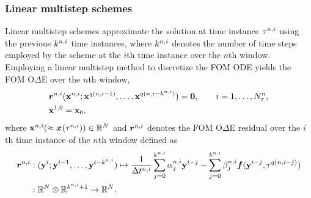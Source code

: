 \subsubsection{Linear multistep schemes}
Linear multistep schemes approximate the solution at time instance $\tau^{n,i}$ using the previous $k^{n,i}$ time instances, where $k^{n,i}$ denotes the number of time steps employed by the scheme at the $i$th time instance over the $n$th window. 
Employing a linear multistep method to discretize the FOM ODE yields the FOM O$\Delta$E over the $n$th window,
\begin{align*}
&\boldsymbol r_{}^{n,i} ({\mathbf{x}}^{n,i};{\mathbf{x}}^{q(n,i-1)},\ldots,{\mathbf{x}}^{q(n,i-k^{n,i})}) = \boldsymbol 0, \qquad i=1,\ldots,N_{\tau}^{n}, \\
&{\mathbf{x}}^{1,0} = {{\mathbf{x}}_0}. 
\end{align*}
where ${\mathbf{x}}^{n,i} (\approx
{\boldsymbol x}^{}(\tau^{n,i}))
\in \mathbb{R}^{N}$ and $\boldsymbol r_{}^{n,i}$ denotes the FOM O$\Delta$E
residual over the $i$th time instance of the $n$th window  
defined as
\begin{align*}
\boldsymbol r_{}^{n,i} &: (\mathbf{y}^{i};\mathbf{y}^{i-1},\ldots,\mathbf{y}^{i-k^{n,i}}) \mapsto  \frac{1}{\Delta t^{n,i}} \sum_{j=0}^{k^{n,i}} \alpha^{n,i}_j \mathbf{y}^{i-j} -  \sum_{j=0}^{k^{n,i}} \beta^{n,i}_j \boldsymbol f(\mathbf{y}^{i-j},\tau^{q(n,i-j)}) \\
               &: \mathbb{R}^{N} \otimes \mathbb{R}^{k^{n,i}+1} \rightarrow \mathbb{R}^{N}. 
\end{align*}
